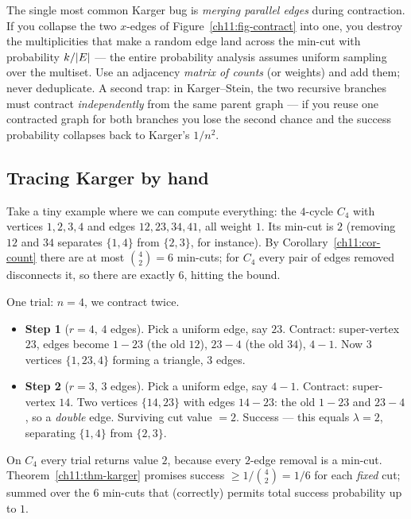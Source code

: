 \begin{trapbox}
The single most common Karger bug is \emph{merging parallel edges} during contraction. If you collapse the two $x$-edges of Figure~\ref{ch11:fig-contract} into one, you destroy the multiplicities that make a random edge land across the min-cut with probability $k/\lvert E\rvert$ --- the entire probability analysis assumes uniform sampling over the multiset. Use an adjacency \emph{matrix of counts} (or weights) and add them; never deduplicate. A second trap: in Karger--Stein, the two recursive branches must contract \emph{independently} from the same parent graph --- if you reuse one contracted graph for both branches you lose the second chance and the success probability collapses back to Karger's $1/n^2$.
\end{trapbox}

\subsection{Tracing Karger by hand}

Take a tiny example where we can compute everything: the $4$-cycle $C_4$ with vertices $1,2,3,4$ and edges $12,23,34,41$, all weight $1$. Its min-cut is $2$ (removing $12$ and $34$ separates $\{1,4\}$ from $\{2,3\}$, for instance). By Corollary~\ref{ch11:cor-count} there are at most $\binom42=6$ min-cuts; for $C_4$ every pair of edges removed disconnects it, so there are exactly $6$, hitting the bound.

One trial: $n=4$, we contract twice.
\begin{itemize}
  \item \textbf{Step 1} ($r=4$, $4$ edges). Pick a uniform edge, say $23$. Contract: super-vertex $23$, edges become $1{-}23$ (the old $12$), $23{-}4$ (the old $34$), $4{-}1$. Now $3$ vertices $\{1, 23, 4\}$ forming a triangle, $3$ edges.
  \item \textbf{Step 2} ($r=3$, $3$ edges). Pick a uniform edge, say $4{-}1$. Contract: super-vertex $14$. Two vertices $\{14, 23\}$ with edges $14{-}23$: the old $1{-}23$ and $23{-}4$, so a \emph{double} edge. Surviving cut value $=2$. Success --- this equals $\lambda=2$, separating $\{1,4\}$ from $\{2,3\}$.
\end{itemize}
On $C_4$ every trial returns value $2$, because every $2$-edge removal is a min-cut. Theorem~\ref{ch11:thm-karger} promises success $\ge 1/\binom42 = 1/6$ for each \emph{fixed} cut; summed over the $6$ min-cuts that (correctly) permits total success probability up to $1$.

